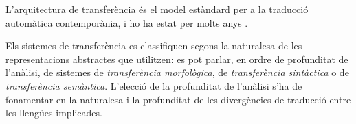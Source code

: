 L'arquitectura de transferència és el model estàndard 
per a la traducció automàtica contemporània, i ho ha estat
per molts anys \citep{arnold93j}.

Els sistemes de transferència es classifiquen segons la naturalesa de
les representacions abstractes que utilitzen: es pot parlar, en ordre de
profunditat de l'anàlisi, de sistemes de \emph{transferència
morfològica}, de \emph{transferència sintàctica} o de {\em
transferència semàntica}.
L'elecció de la profunditat de l'anàlisi s'ha de fonamentar en la
naturalesa i la profunditat de les divergències de traducció
\citep{vandooren93b} entre les llengües implicades.

